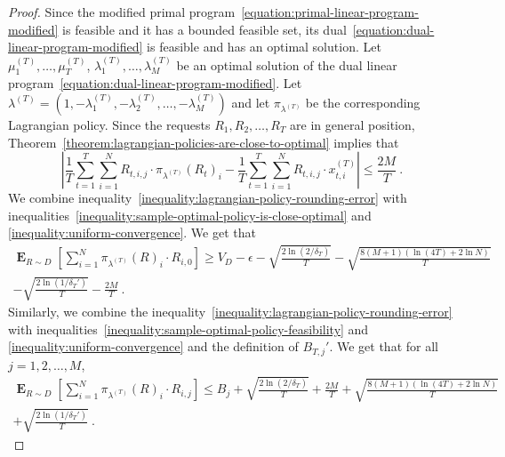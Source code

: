 \documentclass[12pt]{article}
\DeclareMathOperator*{\Exp}{\mathbf{E}}
\theoremstyle{definition}
\begin{document}
\begin{proof}
Since the modified primal
program~\eqref{equation:primal-linear-program-modified} is feasible and it has a
bounded feasible set, its dual~\eqref{equation:dual-linear-program-modified} is
feasible and has an optimal solution. Let $\mu_1^{(T)}, \dots, \mu_T^{(T)}$,
$\lambda_1^{(T)}, \dots, \lambda_M^{(T)}$ be an optimal solution of the dual
linear program~\eqref{equation:dual-linear-program-modified}. Let $\lambda^{(T)}
= (1, -\lambda_1^{(T)}, -\lambda_2^{(T)}, \dots, -\lambda_M^{(T)})$ and let
$\pi_{\lambda^{(T)}}$ be the corresponding Lagrangian policy. Since the requests
$R_1, R_2, \dots, R_T$ are in general position,
Theorem~\ref{theorem:lagrangian-policies-are-close-to-optimal} implies that
\begin{equation}
\label{inequality:lagrangian-policy-rounding-error}
\left| \frac{1}{T} \sum_{t=1}^T \sum_{i=1}^N R_{t,i,j} \cdot \pi_{\lambda^{(T)}}(R_t)_i - \frac{1}{T} \sum_{t=1}^T \sum_{i=1}^N R_{t,i,j} \cdot x^{(T)}_{t,i}  \right| \le \frac{2M}{T} \: .
\end{equation}
We combine inequality~\eqref{inequality:lagrangian-policy-rounding-error} with
inequalities~\eqref{inequality:sample-optimal-policy-is-close-optimal}
and \eqref{inequality:uniform-convergence}. We get that
\begin{multline}
\label{inequality:lagrangian-policy-optimality}
\Exp_{R \sim D} \left[ \sum_{i=1}^N \pi_{\lambda^{(T)}}(R)_i \cdot R_{i,0}  \right] \ge V_D - \epsilon - \sqrt{ \frac{2\ln(2/\delta_T)}{T}} - \sqrt{\frac{8(M+1) (\ln(4T) + 2 \ln N)}{T}} \\
- \sqrt{ \frac{2\ln(1/\delta_T')}{T} } - \frac{2M}{T}  \: .
\end{multline}
Similarly, we combine the
inequality~\eqref{inequality:lagrangian-policy-rounding-error} with
inequalities~\eqref{inequality:sample-optimal-policy-feasibility} and
\eqref{inequality:uniform-convergence} and the definition of $B_{T,j}'$. We get
that for all $j=1,2,\dots,M$,
\begin{multline}
\label{inequality:lagrangian-policy-feasibility}
\Exp_{R \sim D} \left[ \sum_{i=1}^N \pi_{\lambda^{(T)}}(R)_i \cdot R_{i,j}  \right]
\le B_j + \sqrt{ \frac{2\ln(2/\delta_T)}{T}} + \frac{2M}{T}
+ \sqrt{\frac{8(M+1) (\ln(4T) + 2 \ln N)}{T}} \\
+ \sqrt{ \frac{2\ln(1/\delta_T')}{T} }
\: .
\end{multline}


\end{proof}
\end{document}
